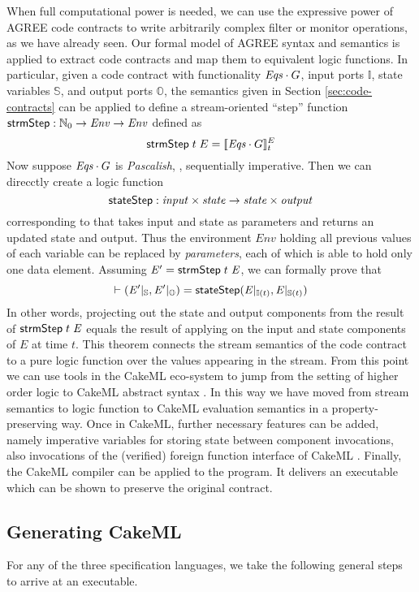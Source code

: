 When full computational power is needed, we can use the expressive
power of AGREE code contracts to write arbitrarily complex filter or
monitor operations, as we have already seen. Our formal model of AGREE
syntax and semantics is applied to extract code contracts and map them
to equivalent logic functions. In particular, given a code contract
with functionality ${\mathit{Eqs}}\cdot G$, input ports $\mathbb{I}$, state
variables $\mathbb{S}$, and output ports $\mathbb{O}$, the semantics
given in Section \ref{sec:code-contracts} can be applied to define a
stream-oriented ``step'' function
$\mathsf{strmStep} : \mathbb{N}_0 \to \mathit{Env} \to \mathit{Env}$ defined as
\[
 \mathsf{strmStep}\;t \; E = [\![ \mathit{Eqs} \cdot G ]\!]^E_t
\]
Now suppose ${\mathit{Eqs}}\cdot G$ is \emph{Pascalish}, \ie, sequentially
imperative. Then we can direcctly create a logic function
\[
\mathsf{stateStep} : \mathit{input} \times \mathit{state} \to \mathit{state} \times \mathit{output}
\]
corresponding to  that takes input and state as
parameters and returns an updated state and output. Thus the
environment $\mathit{Env}$ holding all previous values of each
variable can be replaced by \emph{parameters}, each of which is able
to hold only one data element. Assuming $\mathit{E}'
= \mathsf{strmStep}\;t\; \mathit{E}$, we can formally prove that
\[
\vdash (\mathit{E}' \vert_{\mathbb{S}},
 \mathit{E}' \vert_{\mathbb{O}}) =
\mathsf{stateStep} (\mathit{E}\vert_{\mathbb{I}(t)},
                   \mathit{E}\vert_{\mathbb{S}(t)})
\]
In other words, projecting out the state and output components from
the result of $\mathsf{strmStep}\;t\; \mathit{E}$ equals the result of
applying  on the input and state components of
$\mathit{E}$ at time $t$. This theorem connects the stream semantics
of the code contract to a pure logic function over the values
appearing in the stream. From this point we can use tools in the
CakeML eco-system to jump from the setting of higher order logic to
CakeML abstract syntax \cite{cakeml-translator}. In this way we have
moved from stream semantics to logic function to CakeML evaluation
semantics in a property-preserving way. Once in CakeML, further
necessary features can be added, namely imperative variables for
storing state between component invocations, also invocations of the
(verified) foreign function interface of
CakeML \cite{cakeml-monadic}. Finally, the CakeML compiler can be
applied to the program. It delivers an executable which can be shown
to preserve the original contract.


\subsection{Generating CakeML}
For any of the three specification languages, we take the following general steps to
arrive at an executable.

